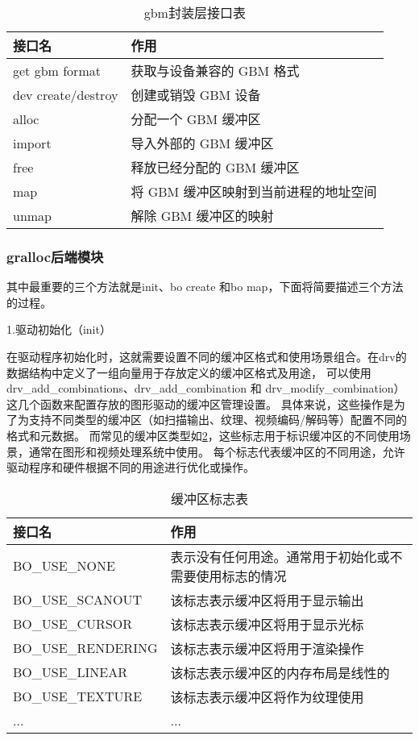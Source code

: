 \begin{table}[h]  
  \centering
  \caption{gbm封装层接口表}
  \label{tab:gbm封装层接口表}
  \begin{tabular}{ll}
    \toprule
    接口名  & 作用\\
    \midrule
    get gbm format & 获取与设备兼容的 GBM 格式 \\
    dev create/destroy & 创建或销毁 GBM 设备 \\
    alloc & 分配一个 GBM 缓冲区 \\
    import & 导入外部的 GBM 缓冲区 \\
    free & 释放已经分配的 GBM 缓冲区 \\
    map & 将 GBM 缓冲区映射到当前进程的地址空间 \\
    unmap & 解除 GBM 缓冲区的映射 \\
    \bottomrule
  \end{tabular}
  \note{}
\end{table}

\subsubsection{gralloc后端模块}
其中最重要的三个方法就是init、bo create 和bo map，下面将简要描述三个方法的过程。

1.驱动初始化（init）

在驱动程序初始化时，这就需要设置不同的缓冲区格式和使用场景组合。在drv的数据结构中定义了一组向量用于存放定义的缓冲区格式及用途，
可以使用drv\_add\_combinations、drv\_add\_combination 和 drv\_modify\_combination）这几个函数来配置存放的图形驱动的缓冲区管理设置。
具体来说，这些操作是为了为支持不同类型的缓冲区（如扫描输出、纹理、视频编码/解码等）配置不同的格式和元数据。
而常见的缓冲区类型如\ref{tab:缓冲区标志表}，这些标志用于标识缓冲区的不同使用场景，通常在图形和视频处理系统中使用。
每个标志代表缓冲区的不同用途，允许驱动程序和硬件根据不同的用途进行优化或操作。

\begin{table}[h]  
  \centering
  \caption{缓冲区标志表}
  \label{tab:缓冲区标志表}
  \begin{tabular}{ll}
    \toprule
    接口名  & 作用\\
    \midrule
    BO\_USE\_NONE & 表示没有任何用途。通常用于初始化或不需要使用标志的情况 \\
    BO\_USE\_SCANOUT & 该标志表示缓冲区将用于显示输出 \\
    BO\_USE\_CURSOR & 该标志表示缓冲区将用于显示光标 \\
    BO\_USE\_RENDERING & 该标志表示缓冲区将用于渲染操作 \\
    BO\_USE\_LINEAR & 该标志表示缓冲区的内存布局是线性的 \\
    BO\_USE\_TEXTURE & 该标志表示缓冲区将作为纹理使用 \\
    ... & ... \\
    \bottomrule
  \end{tabular}
  \note{}
\end{table}

